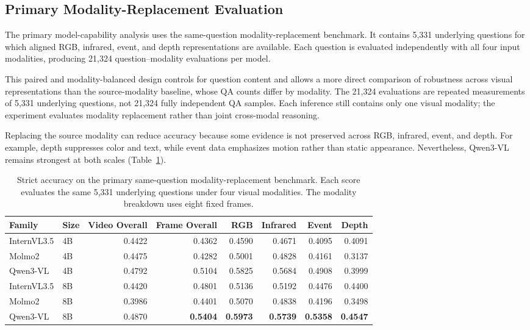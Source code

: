 \subsection{Primary Modality-Replacement Evaluation}
\label{sec:primary_modality_replacement}

The primary model-capability analysis uses the same-question
modality-replacement benchmark. It contains 5,331 underlying questions for
which aligned RGB, infrared, event, and depth representations are available.
Each question is evaluated independently with all four input modalities,
producing 21,324 question--modality evaluations per model.

This paired and modality-balanced design controls for question content and
allows a more direct comparison of robustness across visual representations
than the source-modality baseline, whose QA counts differ by modality. The
21,324 evaluations are repeated measurements of 5,331 underlying questions,
not 21,324 fully independent QA samples. Each inference still contains only
one visual modality; the experiment evaluates modality replacement rather
than joint cross-modal reasoning.

Replacing the source modality can reduce accuracy because some evidence is not
preserved across RGB, infrared, event, and depth. For example, depth suppresses
color and text, while event data emphasizes motion rather than static
appearance. Nevertheless, Qwen3-VL remains strongest at both scales
(Table~\ref{tab:cross_modality_results}).

\begin{table}[ht]
    \centering
    \caption{Strict accuracy on the primary same-question modality-replacement benchmark. Each score evaluates the same 5,331 underlying questions under four visual modalities. The modality breakdown uses eight fixed frames.}
    \label{tab:cross_modality_results}
    \begin{tabular}{llrrrrrr}
        \toprule
        \textbf{Family} & \textbf{Size} & \textbf{Video Overall} & \textbf{Frame Overall} & \textbf{RGB} & \textbf{Infrared} & \textbf{Event} & \textbf{Depth} \\
        \midrule
        InternVL3.5 & 4B & 0.4422 & 0.4362 & 0.4590 & 0.4671 & 0.4095 & 0.4091 \\
        Molmo2      & 4B & 0.4475 & 0.4282 & 0.5001 & 0.4828 & 0.4161 & 0.3137 \\
        Qwen3-VL    & 4B & 0.4792 & 0.5104 & 0.5825 & 0.5684 & 0.4908 & 0.3999 \\
        \midrule
        InternVL3.5 & 8B & 0.4420 & 0.4801 & 0.5136 & 0.5192 & 0.4476 & 0.4400 \\
        Molmo2      & 8B & 0.3986 & 0.4401 & 0.5070 & 0.4838 & 0.4196 & 0.3498 \\
        Qwen3-VL    & 8B & 0.4870 & \textbf{0.5404} & \textbf{0.5973} & \textbf{0.5739} & \textbf{0.5358} & \textbf{0.4547} \\
        \bottomrule
    \end{tabular}
\end{table}


